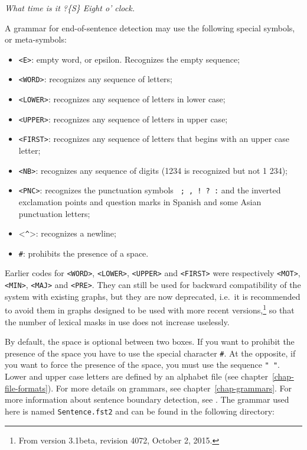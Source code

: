 \bigskip
\textit{What time is it ?\{S\} Eight o' clock.}

\bigskip
\noindent A  grammar for end-of-sentence detection may use the following
special symbols, or meta-symbols:

\index{\verbc{<^>}}\index{\verbt{\#}}
\begin{itemize}
  \item \verb+<E>+: empty word, or epsilon. Recognizes the empty sequence;
  \item \verb+<WORD>+: recognizes any sequence of letters;
  \item \verb+<LOWER>+: recognizes any sequence of letters in lower case;
  \item \verb+<UPPER>+: recognizes any sequence of letters in upper case;
  \item \verb+<FIRST>+: recognizes any sequence of letters that begins with an upper case letter;
  \item \verb+<NB>+: recognizes any sequence of digits (1234 is recognized but not 1
  234);
  \item \verb+<PNC>+: recognizes the punctuation symbols \verb+ ; , ! ? :+ and the
  inverted exclamation points and question marks in Spanish and some Asian
  punctuation letters;
  \item <\verb+^+>: recognizes a newline;
  \item \verb+#+:
  prohibits the presence of a space.
\end{itemize}

\noindent Earlier codes for \verb+<WORD>+, \verb+<LOWER>+, \verb+<UPPER>+ and \verb+<FIRST>+
were respectively \verb+<MOT>+, \verb+<MIN>+, \verb+<MAJ>+ and \verb+<PRE>+.
They can still be used for backward compatibility of the system with existing graphs,
but they are now deprecated, i.e.\ it is recommended to avoid them in graphs designed to be used with
more recent versions,\footnote{From version 3.1beta, revision 4072, October 2, 2015.}
so that the number of lexical masks in use does not increase uselessly.

\bigskip
\noindent By default, the space is optional between two boxes. If you want to prohibit the
presence of the space you have to use the special character  \verb+#+. At the
opposite, if you want to force the presence of the space, you must use the
sequence \verb+" "+. Lower and upper case letters are defined by an alphabet
file (see chapter~\ref{chap-file-formats}). For
more details on grammars, see chapter~\ref{chap-grammars}.
For more information about sentence boundary detection, see
\cite{ameliorer-decoupage-en-phrases}. The grammar used here is named
\verb+Sentence.fst2+ and can be found in the following directory:

